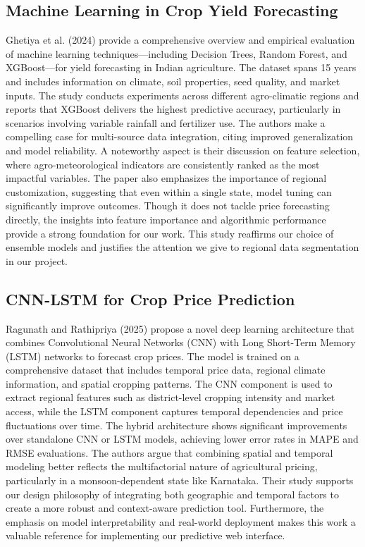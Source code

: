 \subsection{Machine Learning in Crop Yield Forecasting \cite{ghetiya2024ml}}
Ghetiya et al. (2024) provide a comprehensive overview and empirical evaluation of machine learning techniques—including Decision Trees, Random Forest, and XGBoost—for yield forecasting in Indian agriculture. The dataset spans 15 years and includes information on climate, soil properties, seed quality, and market inputs. The study conducts experiments across different agro-climatic regions and reports that XGBoost delivers the highest predictive accuracy, particularly in scenarios involving variable rainfall and fertilizer use. The authors make a compelling case for multi-source data integration, citing improved generalization and model reliability. A noteworthy aspect is their discussion on feature selection, where agro-meteorological indicators are consistently ranked as the most impactful variables. The paper also emphasizes the importance of regional customization, suggesting that even within a single state, model tuning can significantly improve outcomes. Though it does not tackle price forecasting directly, the insights into feature importance and algorithmic performance provide a strong foundation for our work. This study reaffirms our choice of ensemble models and justifies the attention we give to regional data segmentation in our project.

\subsection{CNN-LSTM for Crop Price Prediction \cite{ragunath2025cnn}}
Ragunath and Rathipriya (2025) propose a novel deep learning architecture that combines Convolutional Neural Networks (CNN) with Long Short-Term Memory (LSTM) networks to forecast crop prices. The model is trained on a comprehensive dataset that includes temporal price data, regional climate information, and spatial cropping patterns. The CNN component is used to extract regional features such as district-level cropping intensity and market access, while the LSTM component captures temporal dependencies and price fluctuations over time. The hybrid architecture shows significant improvements over standalone CNN or LSTM models, achieving lower error rates in MAPE and RMSE evaluations. The authors argue that combining spatial and temporal modeling better reflects the multifactorial nature of agricultural pricing, particularly in a monsoon-dependent state like Karnataka. Their study supports our design philosophy of integrating both geographic and temporal factors to create a more robust and context-aware prediction tool. Furthermore, the emphasis on model interpretability and real-world deployment makes this work a valuable reference for implementing our predictive web interface.

